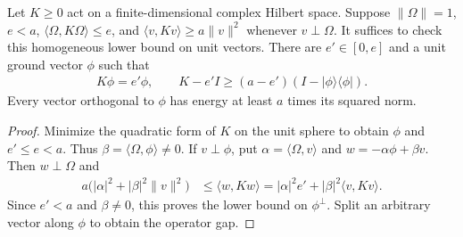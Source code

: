 \begin{lemma}
    \label{lem:aklv_codimension_one_gap}
    \leanok
    Let $K\ge0$ act on a finite-dimensional complex Hilbert space.
    Suppose $\|\Omega\|=1$, $e<a$, $\langle\Omega,K\Omega\rangle\le e$,
    and $\langle v,Kv\rangle\ge a\|v\|^2$ whenever $v\perp\Omega$.
    It suffices to check this homogeneous lower bound on unit vectors.
    There are $e'\in[0,e]$ and a unit ground vector $\phi$ such that
    \begin{align}
        K\phi=e'\phi,\qquad
        K-e'I\ge(a-e')(I-|\phi\rangle\langle\phi|).
    \end{align}
    Every vector orthogonal to $\phi$ has energy at least $a$ times its
    squared norm.
\end{lemma}
\begin{proof}\leanok
    Minimize the quadratic form of $K$ on the unit sphere to obtain
    $\phi$ and $e'\le e<a$. Thus $\beta=\langle\Omega,\phi\rangle\ne0$.
    If $v\perp\phi$, put $\alpha=\langle\Omega,v\rangle$ and
    $w=-\alpha\phi+\beta v$. Then $w\perp\Omega$ and
    \begin{align}
        a\bigl(|\alpha|^2+|\beta|^2\|v\|^2\bigr)
         & \le\langle w,Kw\rangle
        =|\alpha|^2e'+|\beta|^2\langle v,Kv\rangle.
    \end{align}
    Since $e'<a$ and $\beta\ne0$, this proves the lower bound on
    $\phi^\perp$. Split an arbitrary vector along $\phi$ to obtain the
    operator gap.
\end{proof}

